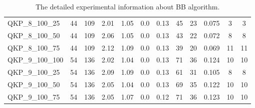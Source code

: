 \begin{table}[!h]
{\begin{tabular}{lccccccccccc}
QKP\_8\_100\_25 & 44 & 109 & 2.01 & 1.05 & 0.0 & 0.13 & 45 & 23 & 0.075 & 3 & 3\\
QKP\_8\_100\_50 & 44 & 109 & 2.06 & 1.05 & 0.0 & 0.13 & 43 & 22 & 0.072 & 8 & 8\\
QKP\_8\_100\_75 & 44 & 109 & 2.12 & 1.09 & 0.0 & 0.13 & 39 & 20 & 0.069 & 11 & 11\\
QKP\_9\_100\_100 & 54 & 136 & 2.02 & 1.04 & 0.0 & 0.13 & 71 & 36 & 0.124 & 10 & 10\\
QKP\_9\_100\_25 & 54 & 136 & 2.09 & 1.09 & 0.0 & 0.13 & 61 & 31 & 0.105 & 8 & 8\\
QKP\_9\_100\_50 & 54 & 136 & 2.05 & 1.04 & 0.0 & 0.13 & 69 & 35 & 0.122 & 10 & 10\\
QKP\_9\_100\_75 & 54 & 136 & 2.05 & 1.07 & 0.0 & 0.12 & 71 & 36 & 0.123 & 10 & 10\\
\bottomrule
\end{tabular}%
}%
\caption{The detailed experimental information about BB algorithm.}
\label{tab:table_$m}
\end{table}

